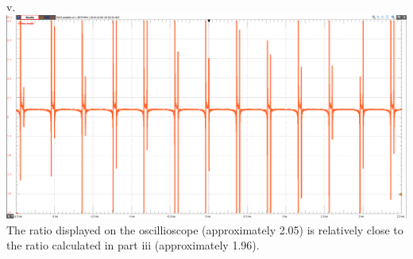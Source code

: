 \documentclass[12pt]{article}
\begin{document}
v. \\
\includegraphics[width=\textwidth]{Q5.png} \\
The ratio displayed on the oscillioscope (approximately 2.05) is relatively close to the ratio calculated in part iii (approximately 1.96).
\end{document}
